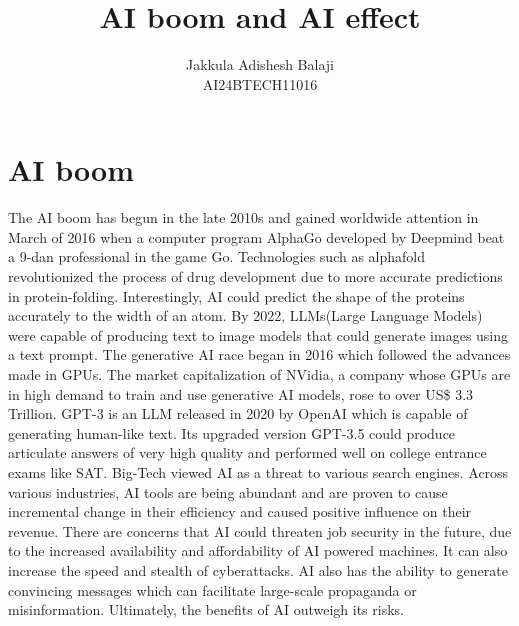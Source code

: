 \documentclass[final]{article}
\title{AI boom and AI effect}
\author{
	Jakkula Adishesh Balaji \\
	AI24BTECH11016 \\ 
	}
\begin{document}
\maketitle

\section{AI boom}
The AI boom has begun in the late 2010s and gained worldwide attention in March of 2016 when a computer program AlphaGo developed by Deepmind beat a 9-dan professional in the game Go. Technologies such as alphafold revolutionized the process of drug development due to more accurate predictions in protein-folding. Interestingly, AI could predict the shape of the proteins accurately to the width of an atom. By 2022, LLMs(Large Language Models) were capable of producing text to image models that could generate images using a text prompt. The generative AI race began in 2016 which followed the advances made in GPUs. The market capitalization of NVidia, a company whose GPUs are in high demand to train and use generative AI models, rose to over US\$ 3.3 Trillion. GPT-3 is an LLM released in 2020 by OpenAI which is capable of generating human-like text. Its upgraded version GPT-3.5 could produce articulate answers of very high quality and performed well on college entrance exams like SAT. Big-Tech viewed AI as a threat to various search engines. Across various industries, AI tools are being abundant and are proven to cause incremental change in their efficiency and caused positive influence on their revenue. There are concerns that AI could threaten job security in the future, due to the increased availability and affordability of AI powered machines. It can also increase the speed and stealth of cyberattacks. AI also has the ability to generate convincing messages which can facilitate large-scale propaganda or misinformation. Ultimately, the benefits of AI outweigh its risks.
\end{document}
